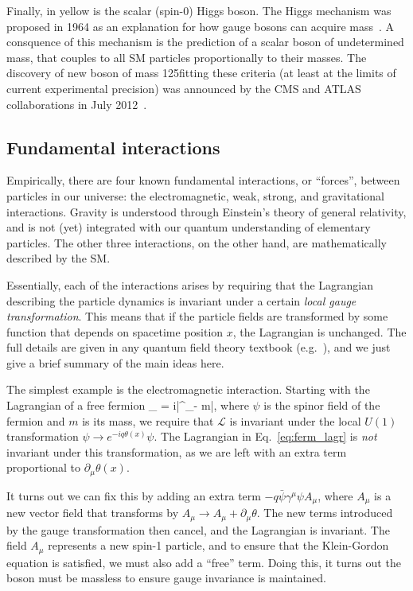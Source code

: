 Finally, in yellow is the scalar (spin-0) Higgs boson. The Higgs mechanism was proposed in 1964 as an explanation
for how gauge bosons can acquire mass~\cite{Englert,Higgs,Guralnik}. A consquence of this mechanism is the prediction of a
scalar boson of undetermined mass, that couples to all SM particles proportionally to their masses.
The discovery of new boson of mass 125\GeV fitting these criteria (at least at the limits of current experimental precision) 
was announced by the CMS and ATLAS collaborations in July 2012~\cite{ATLAS:higgs,CMS:higgs}.

\subsection{Fundamental interactions}
\label{sec:fund_int}

Empirically, there are four known fundamental interactions, or ``forces'', between particles in our universe: 
the electromagnetic, weak, strong, and gravitational interactions. Gravity is understood
through Einstein's theory of general relativity, and is not (yet) integrated with our quantum understanding
of elementary particles. The other three interactions, on the other hand, are mathematically described by the
SM.

Essentially, each of the interactions arises by requiring that the Lagrangian describing the particle dynamics is
invariant under a certain \textit{local gauge transformation}. This means that if the particle fields are transformed
by some function that depends on spacetime position $x$, the Lagrangian is unchanged.
The full details are given in any quantum field theory textbook (e.g.~\cite{Peskin}), and we just give a brief
summary of the main ideas here.

The simplest example is the electromagnetic interaction. Starting with the Lagrangian of a free fermion
\be\label{eq:ferm_lagr}
_ = i\bar{\psi}\gamma^\mu\partial_\mu\psi - m\bar{\psi}\psi,
\ee
where $\psi$ is the spinor field of the fermion and $m$ is its mass,
we require that $\mathcal{L}$ is invariant under the local $U(1)$ transformation $\psi\to e^{-iq\theta(x)}\psi$.
The Lagrangian in Eq.~\ref{eq:ferm_lagr} is \textit{not} invariant under this transformation,
as we are left with an extra term proportional to $\partial_\mu\theta(x)$.

It turns out we can fix this by adding an extra term $-q\bar{\psi}\gamma^\mu\psi A_\mu$, where
$A_\mu$ is a new vector field that transforms by $A_\mu\to A_\mu+\partial_\mu\theta$. The new terms
introduced by the gauge transformation then cancel, and the Lagrangian is invariant.  The field
$A_\mu$ represents a new spin-1 particle, and to ensure that the Klein-Gordon equation is satisfied,
we must also add a ``free'' term. Doing this, it turns out the boson must be massless to ensure gauge invariance is
maintained.

